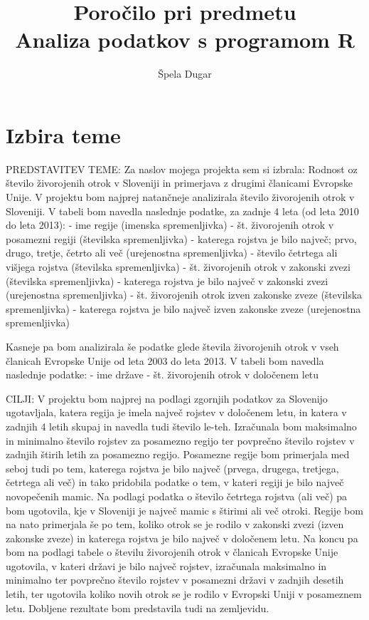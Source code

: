 \documentclass[11pt,a4paper]{article}
\begin{document}
\title{Poročilo pri predmetu \\
Analiza podatkov s programom R}
\author{Špela Dugar}
\maketitle

\section{Izbira teme}

PREDSTAVITEV TEME:
Za naslov mojega projekta sem si izbrala: Rodnost oz število živorojenih otrok v Sloveniji in primerjava z drugimi članicami Evropske Unije.
V projektu bom najprej natančneje analizirala število živorojenih otrok v Sloveniji. V tabeli bom navedla naslednje podatke, za zadnje 4 leta (od leta 2010 do leta 2013):
- ime regije (imenska spremenljivka)
- št. živorojenih otrok v posamezni regiji (številska spremenljivka)
- katerega rojstva je bilo največ; prvo, drugo, tretje, četrto ali več (urejenostna spremenljivka)
- število četrtega ali višjega rojstva (številska spremenljivka)
- št. živorojenih otrok v zakonski zvezi (številska spremenljivka)
- katerega rojstva je bilo največ v zakonski zvezi (urejenostna spremenljivka)
- št. živorojenih otrok izven zakonske zveze (številska spremenljivka)
- katerega rojstva je bilo največ izven zakonske zveze (urejenostna spremenljivka)

Kasneje pa bom analizirala še podatke glede števila živorojenih otrok v vseh članicah Evropske Unije od leta 2003 do leta 2013. V tabeli bom navedla naslednje podatke:
- ime države
- št. živorojenih otrok v določenem letu

 

CILJI:
V projektu bom najprej na podlagi zgornjih podatkov za Slovenijo ugotavljala, katera regija je imela največ rojstev v določenem letu, in katera v zadnjih 4 letih skupaj in navedla tudi število le-teh. Izračunala bom maksimalno in minimalno število rojstev za posamezno regijo ter povprečno število rojstev v zadnjih štirih letih za posamezno regijo. Posamezne regije bom primerjala med seboj tudi po tem, katerega rojstva je bilo največ (prvega, drugega, tretjega, četrtega ali več) in tako pridobila podatke o tem, v kateri regiji je bilo največ novopečenih mamic. Na podlagi podatka o število četrtega rojstva (ali več) pa bom ugotovila, kje v Sloveniji je največ mamic s štirimi ali več otroki.
Regije bom na nato primerjala še po tem, koliko otrok se je rodilo v zakonski zvezi (izven zakonske zveze) in katerega rojstva je bilo največ v določenem letu.
Na koncu pa bom na podlagi tabele o številu živorojenih otrok v članicah Evropske Unije ugotovila, v kateri državi je bilo največ rojstev, izračunala maksimalno in minimalno ter povprečno število rojstev v posamezni državi v zadnjih desetih letih, ter ugotovila koliko novih otrok se je rodilo v Evropski Uniji v posameznem letu.
Dobljene rezultate bom predstavila tudi na zemljevidu.
\end{document}
